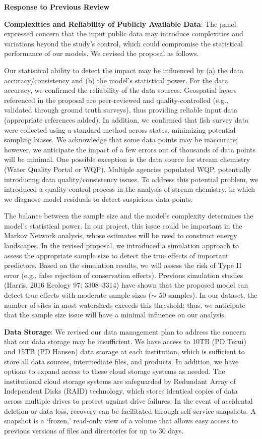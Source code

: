 \documentclass[12pt, class=article, crop=false]{standalone}
\begin{document}
\textbf{Response to Previous Review}

\textbf{Complexities and Reliability of Publicly Available Data}:
The panel expressed concern that the input public data may introduce complexities and variations beyond the study's control, which could compromise the statistical performance of our models.
We revised the proposal as follows.

Our statistical ability to detect the impact may be influenced by (a) the data accuracy/consistency and (b) the model's statistical power.
For the data accuracy, we confirmed the reliability of the data sources.
Geospatial layers referenced in the proposal are peer-reviewed and quality-controlled (e.g., validated through ground truth surveys), thus providing reliable input data (appropriate references added).
In addition, we confirmed that fish survey data were collected using a standard method across states, minimizing potential sampling biases.
We acknowledge that some data points may be inaccurate; however, we anticipate the impact of a few errors out of thousands of data points will be minimal.
One possible exception is the data source for stream chemistry (Water Quality Portal or WQP).
Multiple agencies populated WQP, potentially introducing data quality/consistency issues.
To address this potential problem, we introduced a quality-control process in the analysis of stream chemistry, in which we diagnose model residuals to detect suspicious data points.

The balance between the sample size and the model's complexity determines the model's statistical power.
In our project, this issue could be important in the Markov Network analysis, whose estimates will be used to construct energy landscapes.
In the revised proposal, we introduced a simulation approach to assess the appropriate sample size to detect the true effects of important predictors.
Based on the simulation results, we will assess the risk of Type II error (e.g., false rejection of conservation effects).
Previous simulation studies (Harris, 2016 Ecology 97: 3308--3314) have shown that the proposed model can detect true effects with moderate sample sizes ($\sim$ 50 samples).
In our dataset, the number of sites in most watersheds exceeds this threshold; thus, we anticipate that the sample size issue will have a minimal influence on our analysis.

\textbf{Data Storage}:
We revised our data management plan to address the concern that our data storage may be insufficient.
We have access to 10TB (PD Terui) and 15TB (PD Hansen) data storage at each institution, which is sufficient to store all data sources, intermediate files, and products.
In addition, we have options to expand access to these cloud storage systems as needed.
The institutional cloud storage systems are safeguarded by Redundant Array of Independent Disks (RAID) technology, which stores identical copies of data across multiple drives to protect against drive failures.
In the event of accidental deletion or data loss, recovery can be facilitated through self-service snapshots.
A snapshot is a ‘frozen,’ read-only view of a volume that allows easy access to previous versions of files and directories for up to 30 days.
\end{document}
